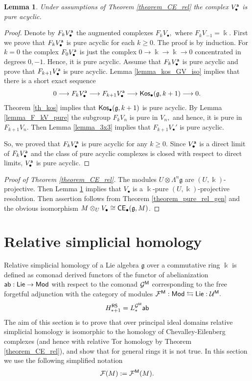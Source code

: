 \documentclass{amsart}
\numberwithin{equation}{section}
\newtheorem{lemma}[theorem]{Lemma}
\theoremstyle{definition}
\def\FF{\mathcal{F}}
\def\GG{\mathcal{G}}
\def\UU{\mathcal{U}}
\def\gg{\mathfrak{g}}
\def\kk{\Bbbk}
\begin{document}
\begin{lemma}\label{lemma_V_pure_acyclic} Under assumptions of Theorem \ref{theorem_CE_rel} the complex $V^{\sf a}_\bullet$ is pure acyclic. 
\end{lemma}
\begin{proof} Denote by $F_kV^{\sf a}_\bullet$ the augmented complexes $F_kV_\bullet,$ where  $F_kV_{-1}=\kk.$
First we prove that $F_kV_\bullet^{\sf a}$ is pure acyclic for each $k\geq 0.$ The proof is by induction. For $k=0$ the complex $F_0V^{\sf a}_\bullet$ is just the complex $0\to \kk\to \kk\to 0$ concentrated in degrees $0,-1.$ Hence, it is pure acyclic. Assume that $F_kV^{\sf a}_\bullet$ is pure acyclic and prove that $F_{k+1}V^{\sf a}_\bullet$ is pure acyclic. Lemma \ref{lemma_kos_GV_iso} implies that there is a short exact sequence
$$0 \longrightarrow F_kV^{\sf a}_\bullet \longrightarrow F_{k+1}V^{\sf a}_\bullet \longrightarrow {\sf Kos}_\bullet(\gg,k+1) \longrightarrow 0.$$
Theorem \ref{th_kos} implies that ${\sf Kos}_\bullet(\gg,k+1)$ is pure acyclic. By Lemma \ref{lemma_F_kV_pure} the subgroup $F_kV_n$ is pure in $V_n,$ and hence, it is pure in $F_{k+1}V_n.$ Then Lemma \ref{lemma_3x3} implies that $F_{k+1}V_\bullet'$ is pure acyclic. 

So, we proved that $F_kV^{\sf a}_\bullet$ is pure acyclic for any $k\geq 0.$ Since $V^{\sf a}_\bullet$ is a direct limit of $F_kV^{\sf a}_\bullet$ and the class of pure acyclic complexes is closed with respect to direct limits, $V_\bullet^{\sf a}$ is pure acyclic. 
\end{proof}


\begin{proof}[Proof of Theorem \ref{theorem_CE_rel}] The modules $U\otimes \Lambda^n \gg$ are $(U,\kk)$-projective. Then Lemma \ref{lemma_V_pure_acyclic} implies that $V_\bullet$ is a $\kk$-pure $(U,\kk)$-projective resolution. Then assertion follows from Theorem \ref{theorem_pure_rel_gen} and the obvious isomorphism $M\otimes_U V_\bullet\cong {\sf CE}_\bullet(\gg,M)$.
\end{proof}






\section{Relative simplicial homology}

Relative simplicial homology of a Lie algebra $\gg$ over a commutative ring $\kk$ is defined as comonad derived functors of the functor of abelianization ${\sf ab}: {\sf Lie}\to {\sf Mod}$ with respect to the comonad $\mathcal G^{\sf M}$ corresponding to the free forgetful adjunction with the category of modules $ \FF^{\sf M}:{\sf Mod} \leftrightarrows {\sf Lie}: \UU^{\sf M}.$
$$H^{\sf RS}_{*+1}=L_*^{\GG^{\sf M}}{\sf ab}$$
The aim of this section is to prove that over principal ideal domains relative simplicial homology is isomorphic to  the homology of Chevalley-Eilenberg complexes (and hence with relative Tor homology by Theorem \ref{theorem_CE_rel}), and show that for general rings it is not true. In this section we use the following simplified notation 
$$\FF(M):=\FF^{\sf M}(M).$$
\end{document}
